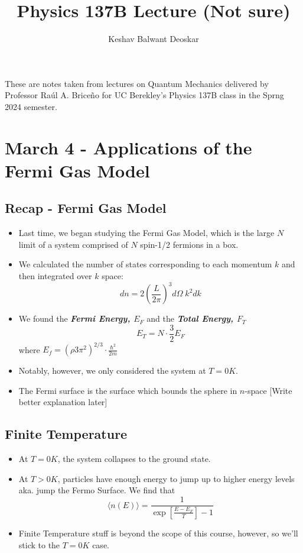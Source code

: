 \documentclass{article}
\title{Physics 137B Lecture (Not sure)}
\author{Keshav Balwant Deoskar}
\newcommand{\mean}[1]{\langle #1 \rangle}
\begin{document}
\maketitle

These are notes taken from lectures on Quantum Mechanics delivered by Professor Raúl A. Briceño for UC Berekley's Physics 137B class in the Sprng 2024 semester.

\tableofcontents

\pagebreak

\section{March 4 - Applications of the Fermi Gas Model}

\vskip 1cm 

\subsection{Recap - Fermi Gas Model}

\begin{itemize}
  \item Last time, we began studying the Fermi Gas Model, which is the large $N$ limit of a system comprised of $N$ spin-1/2 fermions in a box.
  \item We calculated the number of states corresponding to each momentum $k$ and then integrated over $k$ space:
  \[ dn = 2 \left(\frac{L}{2\pi}\right)^3 d\Omega \; k^2 dk  \]
  \item We found the \emph{\textbf{Fermi Energy, $E_F$}} and the \emph{\textbf{Total Energy, $F_T$}}
  \[ E_T = N \cdot \frac{3}{2} E_F  \]
  where $E_f = \left(\rho 3 \pi^2\right)^{2/3} \cdot \frac{\hbar^2}{2m} $
  \item Notably, however, we only considered the system at $T = 0 K$.
  \item The Fermi surface is the surface which bounds the sphere in $n$-space [Write better explanation later]
\end{itemize}

\vskip 1cm
\subsection{Finite Temperature}
\begin{itemize}
  \item At $T = 0 K$, the system collapses to the ground state.
  \item At $T > 0 K$, particles have enough energy to jump up to higher energy levels aka. jump the Fermo Surface. We find that 
  \[ \mean{n(E)} = \frac{1}{\exp\left[ \frac{E- E_F}{T}\right] - 1}  \]
  \item Finite Temperature stuff is beyond the scope of this course, however, so we'll stick to the $T = 0 K$ case.
\end{itemize}
\end{document}
